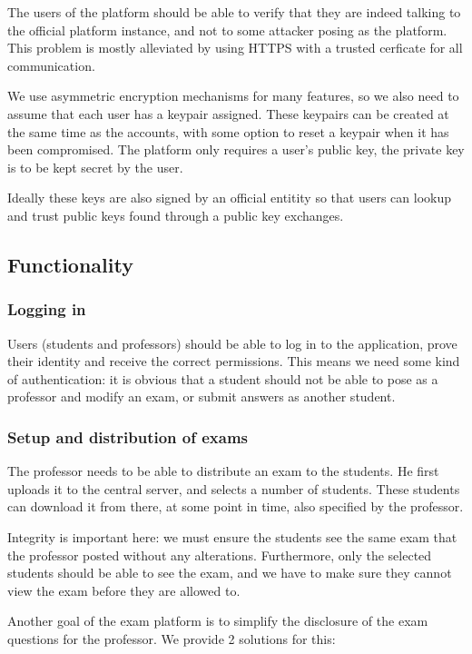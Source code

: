 \documentclass{article}
\begin{document}
The users of the platform should be able to verify that they are indeed talking
to the official platform instance, and not to some attacker posing as the
platform. This problem is mostly alleviated by using HTTPS with a trusted
cerficate for all communication.

We use asymmetric encryption mechanisms for many features, so we also need to
assume that each user has a keypair assigned. These keypairs can be created at
the same time as the accounts, with some option to reset a keypair when it has
been compromised. The platform only requires a user's public key, the private
key is to be kept secret by the user.

Ideally these keys are also signed by an official entitity so that users can
lookup and trust public keys found through a public key exchanges.

\subsection{Functionality}
\label{subsec:req-functionality}

\subsubsection{Logging in}

Users (students and professors) should be able to log in to the application,
prove their identity and receive the correct permissions. This means we need
some kind of authentication: it is obvious that a student should not be able to
pose as a professor and modify an exam, or submit answers as another student.

\subsubsection{Setup and distribution of exams}

The professor needs to be able to distribute an exam to the students. He first
uploads it to the central server, and selects a number of students. These
students can download it from there, at some point in time, also specified by
the professor.

Integrity is important here: we must ensure the students see the same exam that
the professor posted without any alterations. Furthermore, only the selected
students should be able to see the exam, and we have to make sure they cannot
view the exam before they are allowed to.

Another goal of the exam platform is to simplify the disclosure of the exam
questions for the professor. We provide 2 solutions for this:
\end{document}
